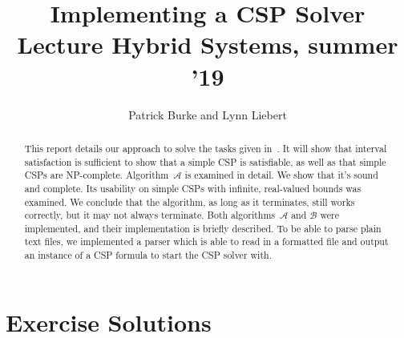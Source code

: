\documentclass{article}
\title{Implementing a CSP Solver\\\small{Lecture Hybrid Systems, summer '19}}
\author{Patrick Burke and Lynn Liebert}
\begin{document}
\maketitle %

\listoftodos

\begin{abstract}
This report details our approach to solve the tasks given in~\cite{MF19}.
It will show that interval satisfaction is sufficient to show that a simple CSP is satisfiable, as well as that simple CSPs are NP-complete.
Algorithm~$\mathcal{A}$ is examined in detail.
We show that it's sound and complete.
Its usability on simple CSPs with infinite, real-valued bounds was examined.
We conclude that the algorithm, as long as it terminates, still works correctly, but it may not always terminate.
Both algorithms~$\mathcal{A}$ and $\mathcal{B}$ were implemented, and their implementation is briefly described.
To be able to parse plain text files, we implemented a parser which is able to read in a formatted file and output an instance of a CSP formula to start the CSP solver with.
\end{abstract}

\tableofcontents
\newpage


\newpage


\section{Exercise Solutions}












%

\clearpage
\appendix
\appendixpage




\end{document}
